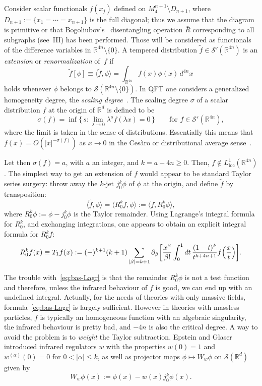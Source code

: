 \documentclass[a4paper,12pt]{article}
\renewcommand{\a}{\alpha}          %
\renewcommand{\b}{\beta}           %
\newcommand{\del}{\partial}        %
\newcommand{\la}{\lambda}          %
\newcommand{\loc}{{\mathrm{loc}}}  %
\newcommand{\R}{\mathbb{R}}        %
\newcommand{\set}[1]{\{\,#1\,\}}   %
\renewcommand{\SS}{\mathcal{S}}    %
\newcommand{\7}{\dagger}           %
\def\<#1,#2>{\langle#1,#2\rangle}  %
\theoremstyle{plain}
\theoremstyle{definition}
\begin{document}
\smallskip

Consider scalar functionals $f(x_j)$ defined on
$M_4^{n+1} \setminus D_{n+1}$, where
$D_{n+1} := \{x_1 =\cdots= x_{n+1}\}$ is the full diagonal; thus we
assume that the diagram is primitive or that Bogoliubov's~\cite{IZ}
disentangling operation $\bar R$ corresponding to all subgraphs
(see~III) has been performed. Those will be considered as functionals
of the difference variables in $\R^{4n} \setminus \{0\}$. A tempered
distribution $\tilde{f}\in\SS'(\R^{4n})$ is an \textit{extension} or
\textit{renormalization} of~$f$ if
$$
\tilde{f}[\phi] \equiv \<\tilde{f},\phi> =
\int_{\R^{4n}} f(x)\phi(x) \,d^{4n}x
$$
holds whenever $\phi$ belongs to $\SS(\R^{4n}\setminus\{0\})$. In QFT
one considers a generalized homogeneity degree, the \textit{scaling
degree}~\cite{OS}. The scaling degree $\sigma$ of a scalar
distribution $f$ at the origin of $\R^d$ is defined to be
$$
\sigma(f) = \inf \set{s : \lim_{\la\to 0} \la^s f(\la x) = 0}
\qquad\mbox{for } f\in \SS'(\R^{4n}),
$$
where the limit is taken in the sense of distributions. Essentially
this means that $f(x) = O(|x|^{-\sigma(f)})$ as $x \to 0$ in the
Ces\`aro or distributional average sense~\cite{Ricardo}.

Let then $\sigma(f) = a$, with $a$ an integer, and $k = a - 4n\geq 0$.
Then, $f \notin L_\loc^1(\R^{4n})$. The simplest way to get an
extension of $f$ would appear to be standard Taylor series surgery:
throw away the $k$-jet $j^k_0\phi$ of $\phi$ at the origin, and define
$\tilde f$ by transposition:
$$
\<\tilde{f},\phi> = \<R^{k}_0f,\phi> := \<f,R^{k}_0\phi>,
$$
where $R^k_0\phi := \phi - j^k_0\phi$ is the Taylor remainder. Using
Lagrange's integral formula for $R^k_0$, and exchanging
integrations, one appears to obtain an explicit integral formula for
$R^k_0f$:
\begin{equation}
R^k_0f(x) \equiv T_1f(x) := (-)^{k+1} (k+1) \sum_{|\b|=k+1}
\del_\b \biggl[
\frac{x^\b}{\b!} \int_0^1 dt\,\frac{(1-t)^k}{t^{k+4n+1}}
f\Bigl(\frac{x}{t}\Bigr) \biggr].
\label{eq:bas-Lagr}
\end{equation}

The trouble with~\eqref{eq:bas-Lagr} is that the remainder $R^k_0\phi$
is not a test function and therefore, unless the infrared behaviour of
$f$ is good, we can end up with an undefined integral. Actually, for
the needs of theories with only massive fields,
formula~\eqref{eq:bas-Lagr} is largely sufficient. However in theories
with massless particles, $f$ is typically an homogeneous function with
an algebraic singularity, the infrared behaviour is pretty bad, and
$-4n$ is also the critical degree. A way to avoid the problem is to
\textit{weight} the Taylor subtraction. Epstein and Glaser~\cite{EG}
introduced infrared regulators $w$ with the properties $w(0) = 1$ and
$w^{(\a)}(0) = 0$ for $0 < |\a| \leq k$, as well as projector maps
$\phi\mapsto W_w\phi$ on $\SS(\R^{d})$ given by
\begin{equation}
W_w\phi(x) := \phi(x) - w(x) j^k_0\phi (x).
\label{eq:bas-EG}
\end{equation}
\end{document}
